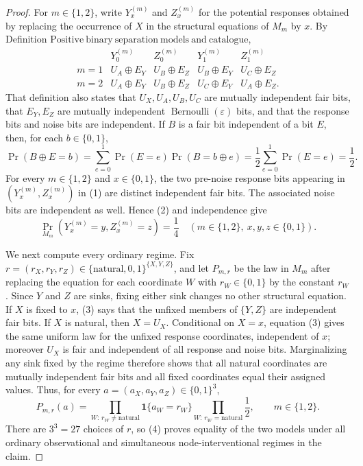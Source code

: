 \documentclass{article}
\begin{document}
\begin{proof}
For \(m\in\{1,2\}\), write \(Y_x^{(m)}\) and \(Z_x^{(m)}\) for the potential responses obtained by replacing the occurrence of \(X\) in the structural equations of \(M_m\) by \(x\).  By Definition \(\mathrm{Positive\ binary\ separation\ models\ and\ catalogue}\),
\[
\begin{array}{c|cc|cc}
 &Y_0^{(m)}&Z_0^{(m)}&Y_1^{(m)}&Z_1^{(m)}\\ \hline
m=1&U_A\mathbin\oplus E_Y&U_B\mathbin\oplus E_Z&U_B\mathbin\oplus E_Y&U_C\mathbin\oplus E_Z\\
m=2&U_A\mathbin\oplus E_Y&U_B\mathbin\oplus E_Z&U_C\mathbin\oplus E_Y&U_A\mathbin\oplus E_Z.
\end{array}
\tag{1}
\]
That definition also states that \(U_X,U_A,U_B,U_C\) are mutually independent fair bits, that \(E_Y,E_Z\) are mutually independent \(\operatorname{Bernoulli}(\varepsilon)\) bits, and that the response bits and noise bits are independent.  If \(B\) is a fair bit independent of a bit \(E\), then, for each \(b\in\{0,1\}\),
\[
 \Pr(B\mathbin\oplus E=b)
 =\sum_{e=0}^{1}\Pr(E=e)\Pr(B=b\mathbin\oplus e)
 =\frac12\sum_{e=0}^{1}\Pr(E=e)=\frac12.
\tag{2}
\]
For every \(m\in\{1,2\}\) and \(x\in\{0,1\}\), the two pre-noise response bits appearing in \((Y_x^{(m)},Z_x^{(m)})\) in (1) are distinct independent fair bits.  The associated noise bits are independent as well.  Hence (2) and independence give
\[
 \Pr_{M_m}\!\left(Y_x^{(m)}=y,Z_x^{(m)}=z\right)=\frac14
 \quad
 (m\in\{1,2\},\ x,y,z\in\{0,1\}).
\tag{3}
\]

We next compute every ordinary regime.  Fix
\(r=(r_X,r_Y,r_Z)\in\{\mathrm{natural},0,1\}^{\{X,Y,Z\}}\), and let \(P_{m,r}\) be the law in \(M_m\) after replacing the equation for each coordinate \(W\) with \(r_W\in\{0,1\}\) by the constant \(r_W\).  Since \(Y\) and \(Z\) are sinks, fixing either sink changes no other structural equation.  If \(X\) is fixed to \(x\), (3) says that the unfixed members of \(\{Y,Z\}\) are independent fair bits.  If \(X\) is natural, then \(X=U_X\).  Conditional on \(X=x\), equation (3) gives the same uniform law for the unfixed response coordinates, independent of \(x\); moreover \(U_X\) is fair and independent of all response and noise bits.  Marginalizing any sink fixed by the regime therefore shows that all natural coordinates are mutually independent fair bits and all fixed coordinates equal their assigned values.  Thus, for every \(a=(a_X,a_Y,a_Z)\in\{0,1\}^3\),
\[
 P_{m,r}(a)
 =\prod_{W:\,r_W\ne\mathrm{natural}}\mathbf 1\{a_W=r_W\}
  \prod_{W:\,r_W=\mathrm{natural}}\frac12,
 \qquad m\in\{1,2\}.
\tag{4}
\]
There are \(3^3=27\) choices of \(r\), so (4) proves equality of the two models under all ordinary observational and simultaneous node-interventional regimes in the claim.


\end{proof}
\end{document}
